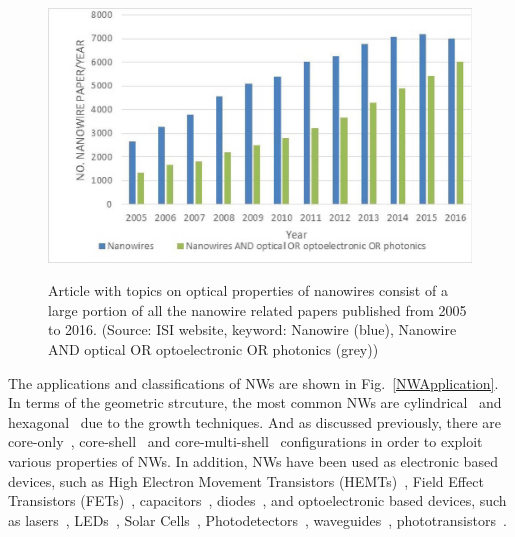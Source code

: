 \begin{figure}
  \caption[Article with topics on optical properties of nanowires consist of a large portion of all the nanowire-related papers published from 2005 to 2016.]{Article with topics on optical properties of nanowires consist of a large portion of all the nanowire related papers published from 2005 to 2016. (Source: ISI website, keyword: Nanowire (blue), Nanowire AND optical OR optoelectronic OR photonics (grey))}
  \centering
  \includegraphics[width=\textwidth]{pictures/Introduction/ISIPublication}
  \label{ISIPublication}
\end{figure}

The applications and classifications of NWs are shown in
Fig.~\ref{NWApplication}. In terms of the geometric strcuture, the most common
NWs are cylindrical~\cite{Cao:2010dc,Cao:2009ho} and
hexagonal~\cite{Royo:2015vw,Currie:2013to} due to the growth techniques. And as
discussed previously, there are
core-only~\cite{Heo:2004fp,he2007piezoelectric,Duan:2003en},
core-shell~\cite{Moratis:2016ws,Wang:2015bz} and
core-multi-shell~\cite{Badada:2015jq,Takehiro:2016tl} configurations in order
to exploit various properties of NWs. In addition, NWs have been used as
electronic based devices, such as High Electron Movement Transistors
(HEMTs)~\cite{li2006dopant,sakaki1980scattering}, Field Effect Transistors
(FETs)~\cite{xiang2006ge,singh2006high,suk2005high},
capacitors~\cite{Liu:2012cz}, diodes~\cite{Wallentin:2010kf,heo2004pt},
and optoelectronic based devices, such as
lasers~\cite{Li:2015ir,Wei:2014hr,Saxena:2013fe,Mayer:2013jh,Chen:2011cg,Hua:2009kf,Agarwal:2005is,Gradecak:2005eb,Duan:2003en},
LEDs~\cite{Zhao:2015hl,Nami:2015df,Chuang:2011jk,Bavencove:2011io,Kim:2004je},
Solar Cells~\cite{Wang:2015dp,Yu:2014hj,Wang:2012dh,Kelzenberg:2010fa,Garnett:2008jk,Tsakalakos:2007kz,Tian:2007kl},
Photodetectors~\cite{Chen:2015dz,deLunaBugallo:2010ci,Cao:2010dc,Pettersson:2006ft,Kind:2002fk,Liang:2001ka},
waveguides~\cite{Grego:2011ka,Oulton:2008fi,Yamada:2005bl,Sirbuly:2005ir,Chandrasekhar:1987kk},
phototransistors~\cite{Zhang:2010fq,Seo:2010cf,Persano:2010if,Park:2008cn,Logeeswaran:2008fw}.

